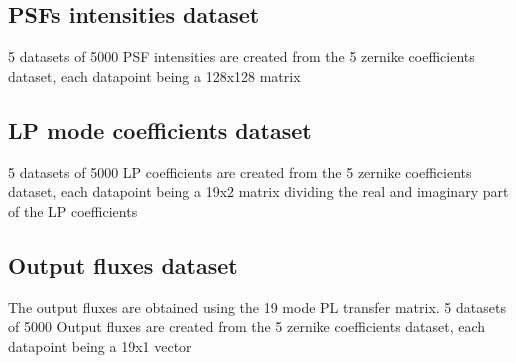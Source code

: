 	\subsection{PSFs intensities dataset}
		5 datasets of 5000 PSF intensities are created from the 5 zernike coefficients dataset, each datapoint being a 128x128 matrix
		
	\subsection{LP mode coefficients dataset}
		5 datasets of 5000 LP coefficients are created from the 5 zernike coefficients dataset, each datapoint being a 19x2 matrix dividing the real and imaginary part of the LP coefficients
		
	\subsection{Output fluxes dataset}
		The output fluxes are obtained using the 19 mode PL transfer matrix.
		5 datasets of 5000 Output fluxes are created from the 5 zernike coefficients dataset, each datapoint being a 19x1 vector
		